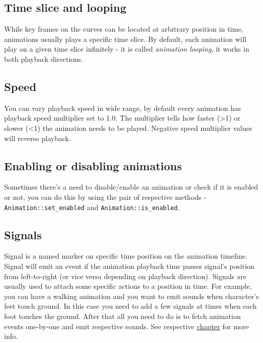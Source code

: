 \documentclass[
]{book}
\theoremstyle{definition}
\theoremstyle{definition}
\theoremstyle{definition}
\theoremstyle{definition}
\theoremstyle{remark}
\begin{document}
\subsection{Time slice and looping}\label{time-slice-and-looping}

While key frames on the curves can be located at arbitrary position in time, animations usually plays a specific time slice. By default, each animation will play on a given time slice infinitely - it is called \emph{animation looping}, it works in both playback directions.

\subsection{Speed}\label{speed}

You can vary playback speed in wide range, by default every animation has playback speed multiplier set to 1.0. The multiplier tells how faster (\textgreater1) or slower (\textless1) the animation needs to be played. Negative speed multiplier values will reverse playback.

\subsection{Enabling or disabling animations}\label{enabling-or-disabling-animations}

Sometimes there's a need to disable/enable an animation or check if it is enabled or not, you can do this by using the pair of respective methods - \texttt{Animation::set\_enabled} and \texttt{Animation::is\_enabled}.

\subsection{Signals}\label{signals}

Signal is a named marker on specific time position on the animation timeline. Signal will emit an event if the animation playback time passes signal's position from left-to-right (or vice versa depending on playback direction). Signals are usually used to attach some specific actions to a position in time. For example, you can have a walking animation and you want to emit sounds when character's feet touch ground. In this case you need to add a few signals at times when each foot touches the ground. After that all you need to do is to fetch animation events one-by-one and emit respective sounds. See respective \href{signal.md}{chapter} for more info.
\end{document}
